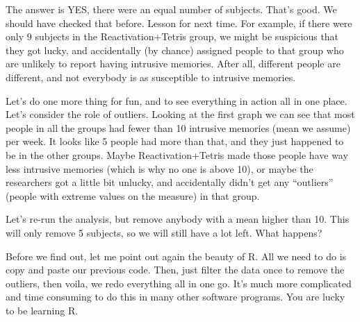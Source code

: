 \documentclass[]{book}
\theoremstyle{definition}
\theoremstyle{definition}
\theoremstyle{definition}
\theoremstyle{remark}
\begin{document}
The answer is YES, there were an equal number of subjects. That's good.
We should have checked that before. Lesson for next time. For example,
if there were only 9 subjects in the Reactivation+Tetris group, we might
be suspicious that they got lucky, and accidentally (by chance) assigned
people to that group who are unlikely to report having intrusive
memories. After all, different people are different, and not everybody
is as susceptible to intrusive memories.

Let's do one more thing for fun, and to see everything in action all in
one place. Let's consider the role of outliers. Looking at the first
graph we can see that most people in all the groups had fewer than 10
intrusive memories (mean we assume) per week. It looks like 5 people had
more than that, and they just happened to be in the other groups. Maybe
Reactivation+Tetris made those people have way less intrusive memories
(which is why no one is above 10), or maybe the researchers got a little
bit unlucky, and accidentally didn't get any ``outliers'' (people with
extreme values on the measure) in that group.

Let's re-run the analysis, but remove anybody with a mean higher than
10. This will only remove 5 subjects, so we will still have a lot left.
What happens?

Before we find out, let me point out again the beauty of R. All we need
to do is copy and paste our previous code. Then, just filter the data
once to remove the outliers, then voila, we redo everything all in one
go. It's much more complicated and time consuming to do this in many
other software programs. You are lucky to be learning R.
\end{document}
